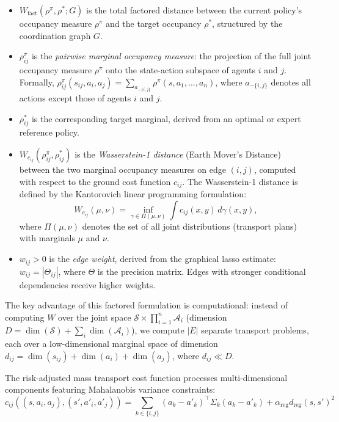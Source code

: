 \documentclass[12pt,a4paper,oneside]{report}
\theoremstyle{definition}
\theoremstyle{remark}
\begin{document}
\begin{itemize}[leftmargin=2em]
  \item $W_{\text{fact}}(\rho^\pi, \rho^*; G)$ is the total factored distance between the current policy's occupancy measure $\rho^\pi$ and the target occupancy $\rho^*$, structured by the coordination graph $G$.
  \item $\rho^\pi_{ij}$ is the \emph{pairwise marginal occupancy measure}: the projection of the full joint occupancy measure $\rho^\pi$ onto the state-action subspace of agents $i$ and $j$. Formally, $\rho^\pi_{ij}(s_{ij}, a_i, a_j) = \sum_{a_{-\{i,j\}}} \rho^\pi(s, a_1, \ldots, a_n)$, where $a_{-\{i,j\}}$ denotes all actions except those of agents $i$ and $j$.
  \item $\rho^*_{ij}$ is the corresponding target marginal, derived from an optimal or expert reference policy.
  \item $W_{c_{ij}}(\rho^\pi_{ij}, \rho^*_{ij})$ is the \emph{Wasserstein-1 distance} (Earth Mover's Distance) between the two marginal occupancy measures on edge $(i,j)$, computed with respect to the ground cost function $c_{ij}$. The Wasserstein-1 distance is defined by the Kantorovich linear programming formulation:
  \[
  W_{c_{ij}}(\mu, \nu) = \inf_{\gamma \in \Pi(\mu, \nu)} \int c_{ij}(x, y) \, d\gamma(x,y),
  \]
  where $\Pi(\mu, \nu)$ denotes the set of all joint distributions (transport plans) with marginals $\mu$ and $\nu$.
  \item $w_{ij} > 0$ is the \emph{edge weight}, derived from the graphical lasso estimate: $w_{ij} = |\Theta_{ij}|$, where $\Theta$ is the precision matrix. Edges with stronger conditional dependencies receive higher weights.
\end{itemize}

\noindent The key advantage of this factored formulation is computational: instead of computing $W$ over the joint space $\mathcal{S} \times \prod_{i=1}^n \mathcal{A}_i$ (dimension $D = \dim(\mathcal{S}) + \sum_i \dim(\mathcal{A}_i)$), we compute $|E|$ separate transport problems, each over a low-dimensional marginal space of dimension $d_{ij} = \dim(s_{ij}) + \dim(a_i) + \dim(a_j)$, where $d_{ij} \ll D$.

\medskip
\noindent The risk-adjusted mass transport cost function processes multi-dimensional components featuring Mahalanobis variance constraints:
\begin{equation} \label{eq:transport_cost}
c_{ij}\left((s, a_i, a_j), (s', a'_i, a'_j)\right) = \sum_{k \in \{i,j\}} (a_k - a'_k)^\top \Sigma_k (a_k - a'_k) + \alpha_{\text{reg}} d_{\text{reg}}(s, s')^2
\end{equation}
\end{document}
